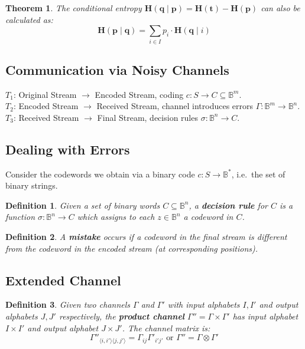 \documentclass[11pt]{article}
\newtheorem{defn}{Definition}
\newtheorem{theo}{Theorem}
\begin{document}
\begin{theo}
  The conditional entropy $\textbf{H}(\textbf{q} \mid \textbf{p}) = \textbf{H}(\textbf{t}) -  \textbf{H}(\textbf{p})$ can also be calculated as:
  \[
    \textbf{H}(\textbf{p} \mid \textbf{q}) = \sum_{i \in I} p_i \cdot \textbf{H}(\textbf{q} \mid i) 
  \]
\end{theo}

\subsection{Communication via Noisy Channels}
$T_1$: Original Stream $\rightarrow$ Encoded Stream, coding $c : S \rightarrow C \subseteq \mathbb{B}^m$. \\

$T_2$: Encoded Stream $\rightarrow$ Received Stream, channel introduces errors $\Gamma : \mathbb{B}^m \rightarrow \mathbb{B}^n$. \\

$T_3$: Received Stream $\rightarrow$ Final Stream, decision rules $\sigma : \mathbb{B}^n \rightarrow C$.

\subsection{Dealing with Errors}
Consider the codewords we obtain via a binary code $c : S \rightarrow \mathbb{B}^*$, i.e.\ the set of binary strings.

\begin{defn}
  Given a set of binary words $C \subseteq \mathbb{B}^n$, a \textbf{decision rule} for $C$ is a function $\sigma : \mathbb{B}^n \rightarrow C$ which assigns to each $z \in \mathbb{B}^n$ a codeword in $C$.
\end{defn}

\begin{defn}
  A \textbf{mistake} occurs if a codeword in the final stream is different from the codeword in the encoded stream (at corresponding positions).
\end{defn}

\subsection{Extended Channel}
\begin{defn}
  Given two channels $\Gamma$ and $\Gamma'$ with input alphabets $I, I'$ and output alphabets $J, J'$ respectively, the \textbf{product channel} $\Gamma'' = \Gamma \times \Gamma'$ has input alphabet $I \times I'$ and output alphabet $J \times J'$.
  The channel matrix is:
  \[
    \Gamma''_{\langle i, i' \rangle \langle j, j' \rangle} = \Gamma_{ij} \Gamma'_{i'j'} \text{ or } \Gamma'' = \Gamma \otimes \Gamma'
  \]
\end{defn}
\end{document}
